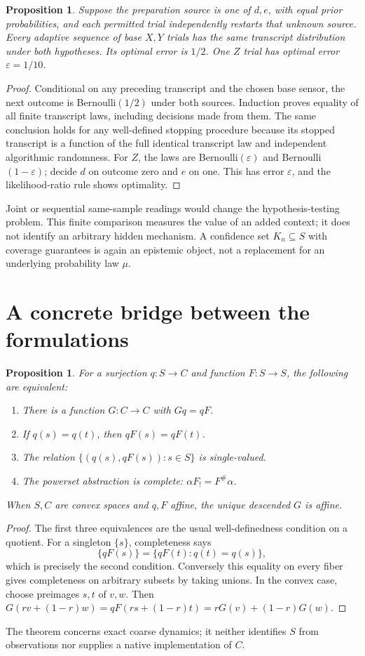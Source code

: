 \documentclass[11pt]{article}
\newtheorem{proposition}[theorem]{Proposition}
\theoremstyle{definition}
\newcommand{\eps}{\varepsilon}
\begin{document}
\begin{proposition}\label{prop:testing}
Suppose the preparation source is one of $d,e$, with equal prior probabilities, and each permitted trial independently restarts that unknown source. Every adaptive sequence of base $X,Y$ trials has the same transcript distribution under both hypotheses. Its optimal error is $1/2$. One $Z$ trial has optimal error $\eps=1/10$.
\end{proposition}
\begin{proof}
Conditional on any preceding transcript and the chosen base sensor, the next outcome is Bernoulli$(1/2)$ under both sources. Induction proves equality of all finite transcript laws, including decisions made from them. The same conclusion holds for any well-defined stopping procedure because its stopped transcript is a function of the full identical transcript law and independent algorithmic randomness. For $Z$, the laws are Bernoulli$(\eps)$ and Bernoulli$(1-\eps)$; decide $d$ on outcome zero and $e$ on one. This has error $\eps$, and the likelihood-ratio rule shows optimality.
\end{proof}
Joint or sequential same-sample readings would change the hypothesis-testing problem. This finite comparison measures the value of an added context; it does not identify an arbitrary hidden mechanism. A confidence set $K_n\subseteq S$ with coverage guarantees is again an epistemic object, not a replacement for an underlying probability law $\mu$.

\section{A concrete bridge between the formulations}
\begin{proposition}\label{prop:bridge}
For a surjection $q:S\to C$ and function $F:S\to S$, the following are equivalent:
\begin{enumerate}
 \item There is a function $G:C\to C$ with $Gq=qF$.
 \item If $q(s)=q(t)$, then $qF(s)=qF(t)$.
 \item The relation $\{(q(s),qF(s)):s\in S\}$ is single-valued.
 \item The powerset abstraction is complete: $\alpha F_!=F^\#\alpha$.
\end{enumerate}
When $S,C$ are convex spaces and $q,F$ affine, the unique descended $G$ is affine.
\end{proposition}
\begin{proof}
The first three equivalences are the usual well-definedness condition on a quotient. For a singleton $\{s\}$, completeness says
\[
 \{qF(s)\}=\{qF(t):q(t)=q(s)\},
\]
which is precisely the second condition. Conversely this equality on every fiber gives completeness on arbitrary subsets by taking unions. In the convex case, choose preimages $s,t$ of $v,w$. Then
$G(rv+(1-r)w)=qF(rs+(1-r)t)=rG(v)+(1-r)G(w)$.
\end{proof}
The theorem concerns exact coarse dynamics; it neither identifies $S$ from observations nor supplies a native implementation of $C$.
\end{document}
